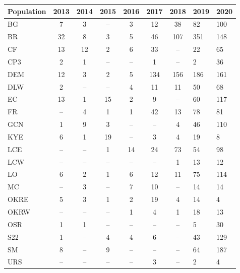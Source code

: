 \documentclass[varwidth=\maxdimen,border=1pt]{standalone}
\begin{document}
 
\begin{tabular}{lcccccc}
  \hline
Population & 2013 & 2014 & 2015 & 2016 & 2017 & 2018 & 2019 & 2020 \\ 
  \hline
BG &   7 &   3 & -- &   3 &  12 &  38 &  82 & 100 \\ 
  BR &  32 &   8 &   3 &   5 &  46 & 107 & 351 & 148 \\ 
  CF &  13 &  12 &   2 &   6 &  33 & -- &  22 &  65 \\ 
  CP3 &   2 &   1 & -- & -- &   1 & -- &   2 &  36 \\ 
  DEM &  12 &   3 &   2 &   5 & 134 & 156 & 186 & 161 \\ 
  DLW &   2 & -- & -- &   4 &  11 &  11 &  50 &  68 \\ 
  EC &  13 &   1 &  15 &   2 &   9 & -- &  60 & 117 \\ 
  FR & -- &   4 &   1 &   1 &  42 &  13 &  78 &  81 \\ 
  GCN &   1 &   9 &   3 & -- & -- &   4 &  46 & 110 \\ 
  KYE &   6 &   1 &  19 & -- &   3 &   4 &  19 &   8 \\ 
  LCE & -- & -- &   1 &  14 &  24 &  73 &  54 &  98 \\ 
  LCW & -- & -- & -- & -- & -- &   1 &  13 &  12 \\ 
  LO &   6 &   2 &   1 &   6 &  12 &  11 &  75 & 114 \\ 
  MC & -- &   3 & -- &   7 &  10 & -- &  14 &  14 \\ 
  OKRE &   5 &   3 &   1 &   2 &  19 &   4 &  14 &   4 \\ 
  OKRW & -- & -- & -- &   1 &   4 &   1 &  18 &  13 \\ 
  OSR &   1 &   1 & -- & -- & -- & -- &   5 &  30 \\ 
  S22 &   1 & -- &   4 &   4 &   6 & -- &  43 & 129 \\ 
  SM &   8 & -- &   9 & -- & -- & -- &  64 & 187 \\ 
  URS & -- & -- & -- & -- &   3 & -- &   2 &   4 \\ 
     \hline
\end{tabular}

 
\end{document}
